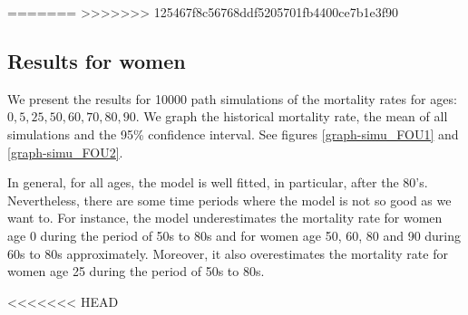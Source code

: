 \documentclass[smallextended]{svjour3}
\begin{document}
=======
>>>>>>> 125467f8c56768ddf5205701fb4400ce7b1e3f90

\subsection{Results for women}\label{re-wom}

We present the results for 10000 path simulations of the mortality 
rates for ages: $0,5,25,50,60,70,80,90$.
We graph the historical mortality rate, the mean of all simulations and the
95\% confidence interval. See figures \ref{graph-simu_FOU1} and
\ref{graph-simu_FOU2}.

In general, for all ages, the model is well fitted, in particular, after the
80's. Nevertheless, there are some time periods where the model is not
so good as we want to. For instance, the model underestimates the mortality
rate for women age 0 during the period of 50s to 80s and for women age 50, 60,
80 and 90 during
60s to 80s approximately. Moreover, it also overestimates the mortality rate for
women age 25 during the period of 50s to 80s.

<<<<<<< HEAD
\end{document}
